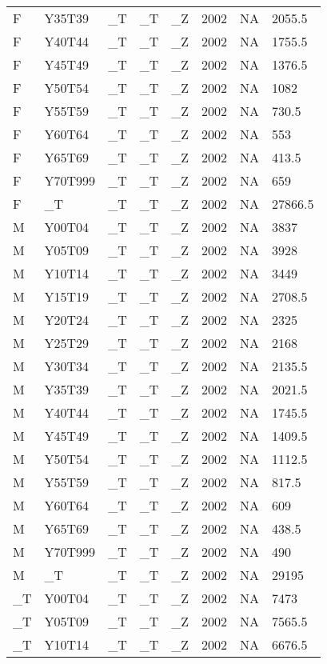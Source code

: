 \begin{longtable}[t]{llllllll}
F & Y35T39 & \_T & \_T & \_Z & 2002 & NA & 2055.5\\
\addlinespace
F & Y40T44 & \_T & \_T & \_Z & 2002 & NA & 1755.5\\
F & Y45T49 & \_T & \_T & \_Z & 2002 & NA & 1376.5\\
F & Y50T54 & \_T & \_T & \_Z & 2002 & NA & 1082\\
F & Y55T59 & \_T & \_T & \_Z & 2002 & NA & 730.5\\
F & Y60T64 & \_T & \_T & \_Z & 2002 & NA & 553\\
\addlinespace
F & Y65T69 & \_T & \_T & \_Z & 2002 & NA & 413.5\\
F & Y70T999 & \_T & \_T & \_Z & 2002 & NA & 659\\
F & \_T & \_T & \_T & \_Z & 2002 & NA & 27866.5\\
M & Y00T04 & \_T & \_T & \_Z & 2002 & NA & 3837\\
M & Y05T09 & \_T & \_T & \_Z & 2002 & NA & 3928\\
\addlinespace
M & Y10T14 & \_T & \_T & \_Z & 2002 & NA & 3449\\
M & Y15T19 & \_T & \_T & \_Z & 2002 & NA & 2708.5\\
M & Y20T24 & \_T & \_T & \_Z & 2002 & NA & 2325\\
M & Y25T29 & \_T & \_T & \_Z & 2002 & NA & 2168\\
M & Y30T34 & \_T & \_T & \_Z & 2002 & NA & 2135.5\\
\addlinespace
M & Y35T39 & \_T & \_T & \_Z & 2002 & NA & 2021.5\\
M & Y40T44 & \_T & \_T & \_Z & 2002 & NA & 1745.5\\
M & Y45T49 & \_T & \_T & \_Z & 2002 & NA & 1409.5\\
M & Y50T54 & \_T & \_T & \_Z & 2002 & NA & 1112.5\\
M & Y55T59 & \_T & \_T & \_Z & 2002 & NA & 817.5\\
\addlinespace
M & Y60T64 & \_T & \_T & \_Z & 2002 & NA & 609\\
M & Y65T69 & \_T & \_T & \_Z & 2002 & NA & 438.5\\
M & Y70T999 & \_T & \_T & \_Z & 2002 & NA & 490\\
M & \_T & \_T & \_T & \_Z & 2002 & NA & 29195\\
\_T & Y00T04 & \_T & \_T & \_Z & 2002 & NA & 7473\\
\addlinespace
\_T & Y05T09 & \_T & \_T & \_Z & 2002 & NA & 7565.5\\
\_T & Y10T14 & \_T & \_T & \_Z & 2002 & NA & 6676.5\\

\end{longtable}
